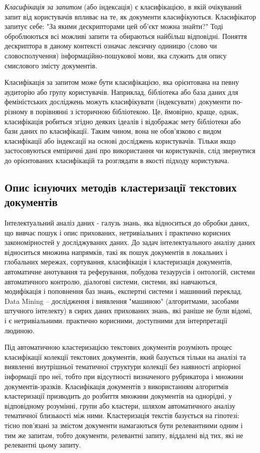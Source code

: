 \textit{Класифікація за запитом} (або індексація) є класифікацією, в якій очікуваний запит від користувачів впливає на те, як документи класифікуються. Класифікатор запитує себе: "За якими дескрипторами цей об'єкт можна знайти?" Тоді оброблюються всі можливі запити та обираються найбільш відповідні. Поняття дескриптора в даному контексті означає лексичну одиницю (слово чи словосполучення) інформаційно-пошукової мови, яка служить для опису смислового змісту документів.

Класифікація за запитом може бути класифікацією, яка орієнтована на певну аудиторію або групу користувачів. Наприклад, бібліотека або база даних для феміністських досліджень можуть класифікувати (індексувати) документи по-різному в порівнянні з історичною бібліотекою. Це, ймовірно, краще, однак, класифікація робиться згідно деяких ідеалів і відображає мету бібліотеки або бази даних по класифікації. Таким чином, вона не обов'язково є видом класифікації або індексації на основі досліджень користувачів. Тільки якщо застосовуються емпіричні дані про використання чи користувачів, слід звернутися до орієнтованих класифікацій та розглядати в якості підходу користувача.

\subsection{Опис існуючих методів кластеризації текстових документів}
Інтелектуальний аналіз даних - галузь знань, яка відноситься до обробки даних, що вивчає пошук і опис прихованих, нетривіальних і практично корисних закономірностей у досліджуваних даних. До задач інтелектуального аналізу даних відноситься множина напрямків, такі як пошук документів в локальних і глобальних мережах, сортування, класифікація і кластеризація документів, автоматичне анотування та реферування, побудова тезаурусів і онтологій, системи автоматичного контролю, діалогові системи, системи, які навчаються, модифікація і поповнення баз знань, експертні системи і машинний переклад. Data Mining – дослідження і виявлення "машиною" (алгоритмами, засобами штучного інтелекту) в сирих даних прихованих знань, які раніше не були відомі, і є нетривіальними. практично корисними, доступними для інтерпретації людиною.

Під автоматичною кластеризацією текстових документів розуміють процес класифікації колекції текстових документів, який базується тільки на аналізі та виявленні внутрішньої тематичної структури колекції без наявності апріорної інформації про неї, тобто при відсутності визначеного рубрикатора і множини документів-зразків. Класифікація документів з використанням алгоритмів кластеризації призводить до розбиття множини документів на однорідні, у відповідному розумінні, групи або кластери, шляхом автоматичного аналізу тематичної близькості між ними. Кластеризація текстів базується на гіпотезі: тісно пов'язані за змістом документи намагаються бути релевантними одним і тим же запитам, тобто документи, релевантні запиту, віддалені від тих, які не релевантні цьому запиту.

